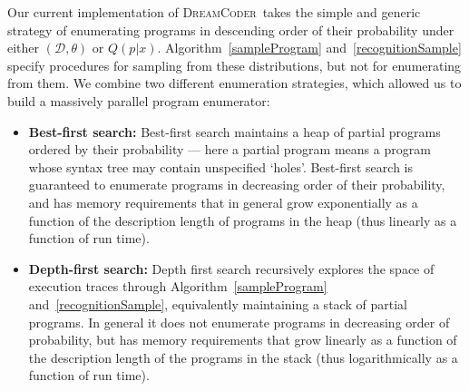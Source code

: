 \documentclass{article}
\newcommand{\system}{\textsc{DreamCoder}~}
\begin{document}
Our current implementation of \system takes the simple and generic strategy of enumerating programs in
descending order of their probability under either $(\mathcal{D},\theta)$ or $Q(p|x)$.
Algorithm~\ref{sampleProgram} and~\ref{recognitionSample}
specify procedures for sampling
from these distributions,
but not for enumerating from them.
We combine two different enumeration strategies,
which allowed us to build a massively parallel program enumerator:
\begin{itemize}
\item \textbf{Best-first search:} Best-first search maintains a heap of
  partial programs ordered by their
  probability --- here a partial program means a program whose syntax tree
  may contain unspecified `holes'. Best-first search
  is guaranteed to enumerate programs in decreasing order of their probability,
  and has memory requirements that in general grow exponentially as a function of the description length of programs in the heap (thus linearly as a function of run time).
\item \textbf{Depth-first search:} Depth first search
  recursively explores the space of
  execution traces through Algorithm~\ref{sampleProgram} and~\ref{recognitionSample},
  equivalently maintaining a stack of partial programs.  
  In general it does not enumerate programs
  in decreasing order of probability,
  but has memory requirements that grow linearly as a function of the description length of the programs in the stack (thus logarithmically as a function of run time).
\end{itemize}
\end{document}
